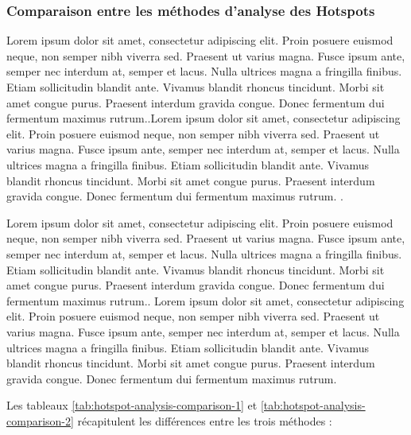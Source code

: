 \subsubsection{Comparaison entre les méthodes d'analyse des Hotspots}
Lorem ipsum dolor sit amet, consectetur adipiscing elit. Proin posuere euismod neque, non semper nibh viverra sed. Praesent ut varius magna. Fusce ipsum ante, semper nec interdum at, semper et lacus. Nulla ultrices magna a fringilla finibus. Etiam sollicitudin blandit ante. Vivamus blandit rhoncus tincidunt. Morbi sit amet congue purus. Praesent interdum gravida congue. Donec fermentum dui fermentum maximus rutrum.\parencite{kalinic_kernel_2018}.Lorem ipsum dolor sit amet, consectetur adipiscing elit. Proin posuere euismod neque, non semper nibh viverra sed. Praesent ut varius magna. Fusce ipsum ante, semper nec interdum at, semper et lacus. Nulla ultrices magna a fringilla finibus. Etiam sollicitudin blandit ante. Vivamus blandit rhoncus tincidunt. Morbi sit amet congue purus. Praesent interdum gravida congue. Donec fermentum dui fermentum maximus rutrum. \parencite{kalinic_kernel_2018}.

\medskip

Lorem ipsum dolor sit amet, consectetur adipiscing elit. Proin posuere euismod neque, non semper nibh viverra sed. Praesent ut varius magna. Fusce ipsum ante, semper nec interdum at, semper et lacus. Nulla ultrices magna a fringilla finibus. Etiam sollicitudin blandit ante. Vivamus blandit rhoncus tincidunt. Morbi sit amet congue purus. Praesent interdum gravida congue. Donec fermentum dui fermentum maximus rutrum.\parencite{chang_introduction_2019}. Lorem ipsum dolor sit amet, consectetur adipiscing elit. Proin posuere euismod neque, non semper nibh viverra sed. Praesent ut varius magna. Fusce ipsum ante, semper nec interdum at, semper et lacus. Nulla ultrices magna a fringilla finibus. Etiam sollicitudin blandit ante. Vivamus blandit rhoncus tincidunt. Morbi sit amet congue purus. Praesent interdum gravida congue. Donec fermentum dui fermentum maximus rutrum.

\medskip

Les tableaux \ref{tab:hotspot-analysis-comparison-1} et \ref{tab:hotspot-analysis-comparison-2} récapitulent les différences entre les trois méthodes :

\medskip


